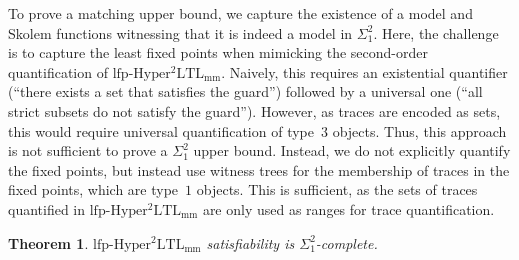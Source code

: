 \documentclass[dvipsnames,10pt,a4paper]{amsart}
\newtheorem{thm}{Theorem}[section]
\theoremstyle{definition}
\theoremstyle{remark}
\newcommand{\lfpsohyltlfp}{\mathrm{lfp\text{-}{Hyper^2LTL_{\mathrm{mm}}}}\xspace}
\newcommand{\myquot}[1]{``#1''}
\begin{document}
To prove a matching upper bound, we capture the existence of a model and Skolem functions witnessing that it is indeed a model in $\Sigma_1^2$.
Here, the challenge is to capture the least fixed points when mimicking the second-order quantification of $\lfpsohyltlfp$. Naively, this requires an existential quantifier (\myquot{there exists a set that satisfies the guard}) followed by a universal one (\myquot{all strict subsets do not satisfy the guard}).
However, as traces are encoded as sets, this would require universal quantification of type~$3$ objects.
Thus, this approach is not sufficient to prove a $\Sigma_1^2$ upper bound.
Instead, we do not explicitly quantify the fixed points, but instead use witness trees for the membership of traces in the fixed points, which are type~$1$ objects.
This is sufficient, as the sets of traces quantified in $\lfpsohyltlfp$ are only used as ranges for trace quantification.



\begin{thm}
\label{thm_satcomplexity_lfp_ss}
$\lfpsohyltlfp$ satisfiability is $\Sigma^2_1$-complete.
\end{thm}
\end{document}
